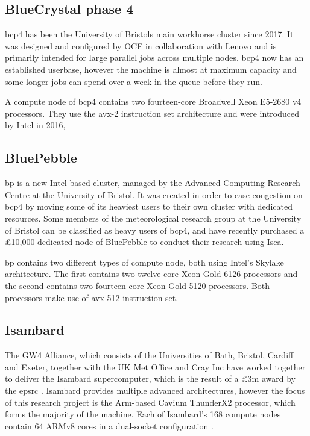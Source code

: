 \documentclass[a4paper,11pt]{report}
\begin{document}

\subsection{BlueCrystal phase 4}
\gls{bcp4} has been the University of Bristols main workhorse cluster since 2017. It was designed and configured by OCF in collaboration with Lenovo and is primarily intended for large parallel jobs across multiple nodes. \gls{bcp4} now has an established userbase, however the machine is almost at maximum capacity and some longer jobs can spend over a week in the queue before they run.
\par
A compute node of \gls{bcp4} contains two fourteen-core Broadwell Xeon E5-2680 v4 processors. They use the \gls{avx}-2 instruction set architecture and were introduced by Intel in 2016, 

\subsection{BluePebble}
\gls{bp} is a new Intel-based cluster, managed by the Advanced Computing Research Centre at the University of Bristol. It was created in order to ease congestion on \gls{bcp4} by moving some of its heaviest users to their own cluster with dedicated resources. Some members of the meteorological research group at the University of Bristol can be classified as heavy users of \gls{bcp4}, and have recently purchased a £10,000 dedicated node of BluePebble to conduct their research using Isca. 
\par
\gls{bp} contains two different types of compute node, both using Intel's Skylake architecture. The first contains two twelve-core Xeon Gold 6126 processors and the second contains two fourteen-core Xeon Gold 5120 processors. Both processors make use of \gls{avx}-512 instruction set. 




\subsection{Isambard}
The GW4 Alliance, which consists of the Universities of Bath, Bristol, Cardiff and Exeter, together with the UK Met Office and Cray Inc have worked together to deliver the Isambard supercomputer, which is the result of a £3m award by the \gls{epsrc} \cite{arm2018white}. Isambard provides multiple advanced architectures, however the focus of this research project is the Arm-based Cavium ThunderX2 processor, which forms the majority of the machine. Each of Isambard's 168 compute nodes contain 64 ARMv8 cores in a dual-socket configuration \cite{thunderprocessor2018brief}. 
\end{document}
